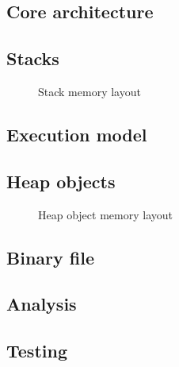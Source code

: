 
\subsection{Core architecture}

\subsection{Stacks}

\begin{figure}[h]
  
  \caption{Stack memory layout}
\end{figure}

\subsection{Execution model}

\subsection{Heap objects}

\begin{figure}[h]
  
  \caption{Heap object memory layout}
\end{figure}

\subsection{Binary file}








\subsection{Analysis}

\subsection{Testing}
